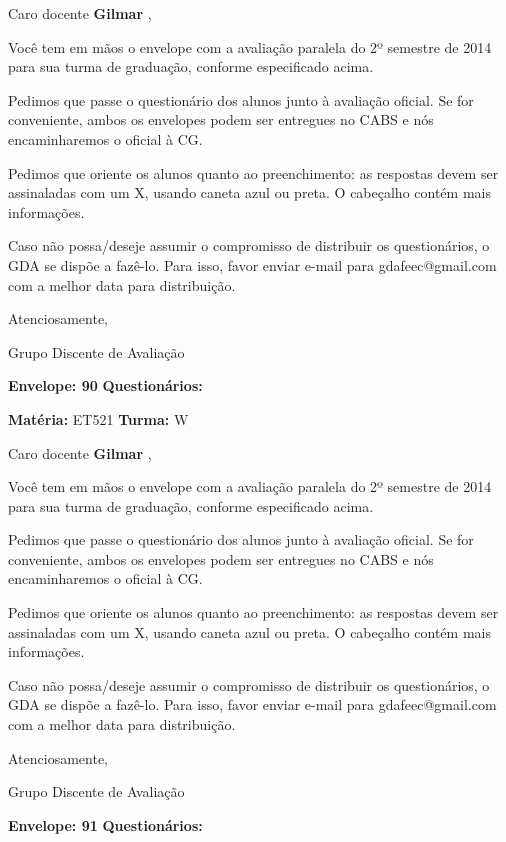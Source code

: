 \documentclass[a5paper]{letter}
\begin{document}
Caro docente {\bf Gilmar }, 

	Você tem em mãos o envelope com a avaliação paralela do 2º semestre de 2014 para sua turma de graduação, conforme especificado acima.

	Pedimos que passe o questionário dos alunos junto à avaliação oficial. Se for conveniente, ambos os envelopes podem ser entregues no CABS e nós encaminharemos o oficial à CG.

Pedimos que oriente os alunos quanto ao preenchimento: as respostas devem ser assinaladas com um X, usando caneta azul ou preta. O cabeçalho contém mais informações.

	Caso não possa/deseje assumir o compromisso de distribuir os questionários, o GDA se dispõe a fazê-lo. Para isso, favor enviar e-mail para gdafeec@gmail.com com a melhor data para distribuição.


Atenciosamente, 

Grupo Discente de Avaliação

\vspace{0.5cm}

{\bf Envelope: 90 }		\hfill	{\bf Questionários:} \hspace{2cm}

\newpage
\thispagestyle{empty}

\hfill {\bf Matéria:} ET521 {\bf Turma:} W

Caro docente {\bf Gilmar }, 

	Você tem em mãos o envelope com a avaliação paralela do 2º semestre de 2014 para sua turma de graduação, conforme especificado acima.

	Pedimos que passe o questionário dos alunos junto à avaliação oficial. Se for conveniente, ambos os envelopes podem ser entregues no CABS e nós encaminharemos o oficial à CG.

Pedimos que oriente os alunos quanto ao preenchimento: as respostas devem ser assinaladas com um X, usando caneta azul ou preta. O cabeçalho contém mais informações.

	Caso não possa/deseje assumir o compromisso de distribuir os questionários, o GDA se dispõe a fazê-lo. Para isso, favor enviar e-mail para gdafeec@gmail.com com a melhor data para distribuição.


Atenciosamente, 

Grupo Discente de Avaliação

\vspace{0.5cm}

{\bf Envelope: 91 }		\hfill	{\bf Questionários:} \hspace{2cm}
\end{document}
